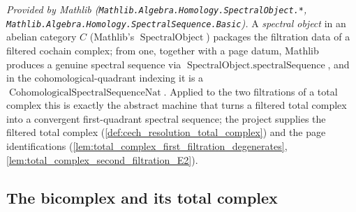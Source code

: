 \begin{lemma}
  \label{lem:spectralObject_spectralSequence_mathlib}
  \mathlibok
  \textit{Provided by Mathlib (\texttt{Mathlib.Algebra.Homology.SpectralObject.*},
  \texttt{Mathlib.Algebra.Homology.SpectralSequence.Basic}).}
  A \emph{spectral object} in an abelian category \(C\) (Mathlib's
  \(\operatorname{SpectralObject}\)) packages the filtration data of a filtered
  cochain complex; from one, together with a page datum, Mathlib produces a genuine
  spectral sequence via \(\operatorname{SpectralObject.spectralSequence}\), and in the
  cohomological-quadrant indexing it is a
  \(\operatorname{CohomologicalSpectralSequenceNat}\). Applied to the two filtrations
  of a total complex this is exactly the abstract machine that turns a filtered total
  complex into a convergent first-quadrant spectral sequence; the project supplies the
  filtered total complex (\cref{def:cech_resolution_total_complex}) and the page
  identifications (\cref{lem:total_complex_first_filtration_degenerates},
  \cref{lem:total_complex_second_filtration_E2}).
\end{lemma}

\subsection{The bicomplex and its total complex}

